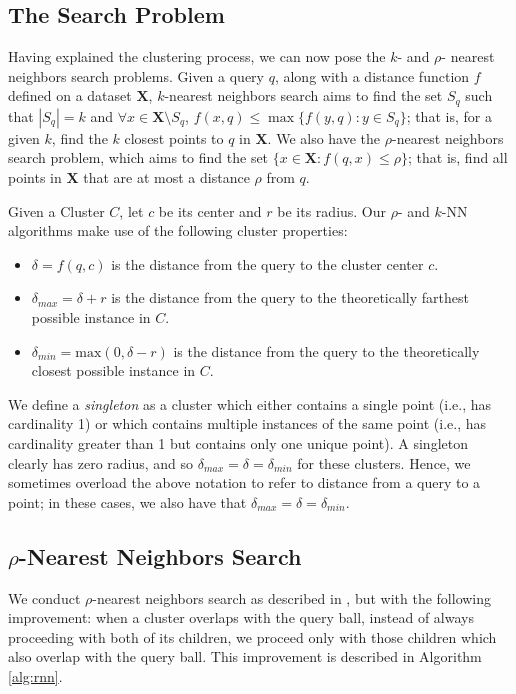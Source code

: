 \subsection{The Search Problem}
\label{subsec:methods:general-search}
Having explained the clustering process, we can now pose the $k$- and $\rho$- nearest neighbors search problems.
Given a query $q$, along with a distance function $f$ defined on a dataset $\textbf{X}$, $k$-nearest neighbors search aims to find 
the set $S_q$ such that  $|S_q| = k$ and $\forall x \in \textbf{X} \setminus S_q$, $f(x, q) \leq \max\{f(y, q): y \in S_q \}$; that is,
for a given $k$, find the $k$ closest points to $q$ in $ \textbf{X}$.
We also have the $\rho$-nearest neighbors search problem, which aims to find the set $\{x \in \textbf{X}: f(q, x) \leq \rho \}$; that is, 
find all points in $\textbf{X}$ that are at most a distance $\rho$ from $q$.

Given a Cluster $C$, let $c$ be its center and $r$ be its radius. Our $\rho$- and $k$-NN algorithms make use of the following cluster 
properties:
\begin{itemize}
    \item $\delta = f(q, c)$ is the distance from the query to the cluster center $c$.
    \item $\delta_{max} = \delta + r$ is the distance from the query to the theoretically farthest possible instance in $C$.
    \item $\delta_{min} = \text{max}(0, \delta - r)$ is the distance from the query to the theoretically closest possible instance in $C$.
\end{itemize}


We define a \emph{singleton} as a cluster which either contains a single point (i.e., has cardinality 1) or which contains 
multiple instances of the same point (i.e., has cardinality greater than 1 but contains only one unique point). A singleton clearly 
has zero radius, and so $\delta_{max}  = \delta = \delta_{min}$ for these clusters. Hence, we sometimes overload the above 
notation to refer to distance from a query to a point; in these cases, we also have that $\delta_{max} = \delta = \delta_{min}$.

\subsection{\texorpdfstring{$\rho$}{p}-Nearest Neighbors Search}
\label{subsec:methods:rnn-search}

We conduct $\rho$-nearest neighbors search as described in \cite{ishaq2019clustered}, but 
with the following improvement: when a cluster overlaps with the query ball, instead of  
always proceeding with both of its children, we proceed only with those children which 
also overlap with the query ball. This improvement is described in Algorithm \ref{alg:rnn}.

